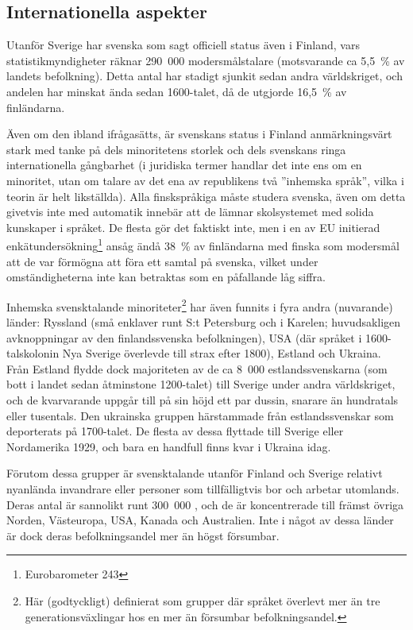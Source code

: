 \begin{multicols}{2}
\subsection{Internationella aspekter}

Utanför Sverige har svenska som sagt officiell status även i Finland,
vars statistikmyndigheter räknar 290~000 modersmålstalare (motsvarande
ca 5,5~\% av landets befolkning). Detta antal har stadigt sjunkit
sedan andra världskriget, och andelen har minskat ända sedan
1600-talet, då de utgjorde 16,5~\% av finländarna.

Även om den ibland ifrågasätts, är svenskans status i Finland
anmärkningsvärt stark med tanke på dels minoritetens storlek och dels
svenskans ringa internationella gångbarhet (i juridiska termer handlar
det inte ens om en minoritet, utan om talare av det ena av republikens
två ''inhemska språk'', vilka i teorin är helt likställda). Alla
finskspråkiga måste studera svenska, även om detta givetvis inte med
automatik innebär att de lämnar skolsystemet med solida kunskaper i
språket. De flesta gör det faktiskt inte, men i en av EU initierad
enkätundersökning\footnote{Eurobarometer 243} ansåg ändå 38~\% av
finländarna med finska som modersmål att de var förmögna att föra ett
samtal på svenska, vilket under omständigheterna inte kan betraktas
som en påfallande låg siffra.


Inhemska svensktalande minoriteter\footnote{Här (godtyckligt)
  definierat som grupper där språket överlevt mer än tre
  generationsväxlingar hos en mer än försumbar befolkningsandel.} har
även funnits i fyra andra (nuvarande) länder: Ryssland (små enklaver
runt S:t Petersburg och i Karelen; huvudsakligen avknoppningar av den
finlandssvenska befolkningen), USA (där språket i 1600-talskolonin Nya
Sverige överlevde till strax efter 1800), Estland och Ukraina. Från
Estland flydde dock majoriteten av de ca 8~000 estlandssvenskarna (som
bott i landet sedan åtminstone 1200-talet) till Sverige under andra
världskriget, och de kvarvarande uppgår till på sin höjd ett par
dussin, snarare än hundratals eller tusentals. Den ukrainska gruppen
härstammade från estlandssvenskar som deporterats på 1700-talet. De
flesta av dessa flyttade till Sverige eller Nordamerika 1929, och bara
en handfull finns kvar i Ukraina idag.

Förutom dessa grupper är svensktalande utanför Finland och Sverige
relativt nyanlända invandrare eller personer som tillfälligtvis bor
och arbetar utomlands. Deras antal är sannolikt runt 300~000
\cite{parkvall2010}, och de är koncentrerade till främst övriga
Norden, Västeuropa, USA, Kanada och Australien. Inte i något av dessa
länder är dock deras befolkningsandel mer än högst försumbar.


\end{multicols}
